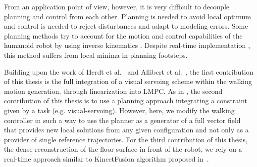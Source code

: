 From an application point of view, however, it is very difficult to decouple planning and control from each other. Planning is needed to avoid local optimum and control is needed to reject disturbances and adapt to modeling errors. Some planning methods try to account for the motion and control capabilities of the humanoid robot by using inverse kinematics \citep{kanoun:ijrr:2011}. Despite real-time implementation \citep{Dang:ichr:2011}, this method suffers from local minima in planning footsteps.

Building upon the work of Herdt et al.~\citep{HerdtAR2010} and Allibert et al.~\citep{Allibert2010}, the first contribution of this thesis is the full integration of a visual servoing scheme within the walking motion generation, through linearization into LMPC. As in \citep{Vahrenkamp:IROS:2009}, the second contribution of this thesis is to use a planning approach integrating a constraint given by a task (e.g. visual-servoing). However, here, we modify the walking controller in such a way to use the planner as a generator of a full vector field that provides new local solutions from any given configuration and not only as a provider of single reference trajectories. For the third contribution of this thesis, the dense reconstruction of the floor surface in front of the robot, we rely on a real-time approach similar to KinectFusion algorithm proposed in~\citep{Newcombe2011}.